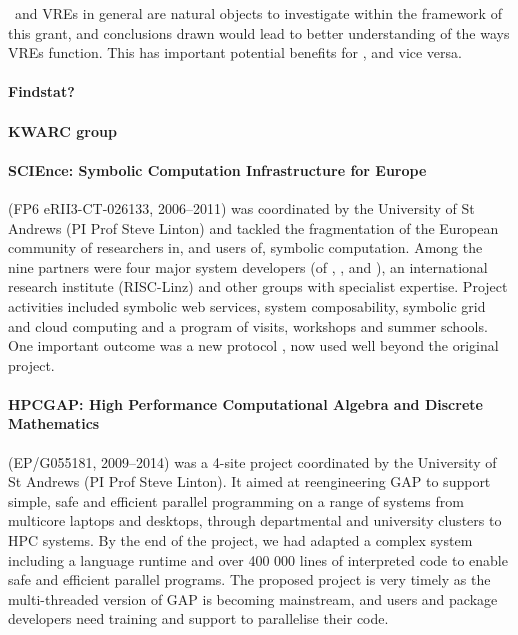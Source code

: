 \TheProject\ and VREs in general are natural objects to investigate
within the framework of this grant, and conclusions drawn would lead to better understanding
of the ways VREs function. This has important potential benefits for \TheProject, and
vice versa.

\paragraph{Findstat?}

\paragraph{KWARC group}

\paragraph{SCIEnce: Symbolic Computation Infrastructure for Europe}
(FP6 eRII3-CT-026133, 2006--2011) was coordinated by the University
of St Andrews (PI Prof Steve Linton) and tackled the fragmentation of the
European community of researchers in, and users of, symbolic computation.
Among the nine partners were four major system developers (of \GAP,
\Maple, \MuPAD and \KANT), an international research institute (RISC-Linz)
and other groups with specialist expertise. Project activities
included symbolic web services, system composability, symbolic
grid and cloud computing and a program of visits, workshops and
summer schools. One important outcome was a new protocol \SCSCP,
now used well beyond the original project.

\paragraph{HPCGAP: High Performance Computational Algebra and
Discrete Mathematics} (EP/G055181, 2009--2014) was a 4-site project
coordinated by the University of St Andrews (PI Prof Steve Linton). It aimed
at reengineering GAP to support simple, safe and efficient parallel
programming on a range of systems from multicore laptops and desktops,
through departmental and university clusters to HPC systems. By the
end of the project, we had adapted a complex system including a
language runtime and over 400 000 lines of interpreted code to enable
safe and efficient parallel programs. The proposed project is very timely as
the multi-threaded version of GAP is becoming mainstream, and users and
package developers need training and support to parallelise their code.

